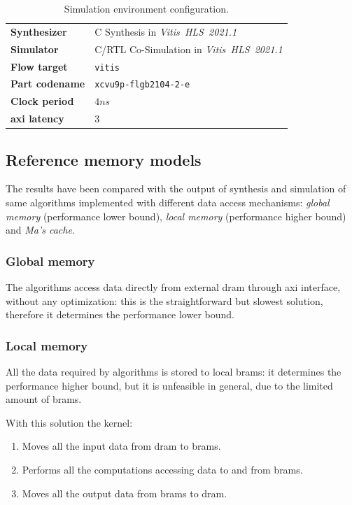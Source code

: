 \documentclass[11pt,a4paper,oneside]{memoir}
\begin{document}
\begin{table}[!htb]
	\begin{center}
		\begin{tabular}{ll}
			\hline
			\rowcolor{gray!25}
			\textbf{Synthesizer} & C Synthesis in
			\emph{Vitis\texttrademark~HLS~2021.1} \\
			\textbf{Simulator} & C/RTL Co-Simulation in
			\emph{Vitis\texttrademark~HLS~2021.1} \\
			\rowcolor{gray!25}
			\textbf{Flow target} & \texttt{vitis} \\
			\textbf{Part codename} & \texttt{xcvu9p-flgb2104-2-e} \\
			\rowcolor{gray!25}
			\textbf{Clock period} & $4 ns$ \\
			\textbf{\ac{axi} latency} & 3 \\
			\hline
		\end{tabular}
	\end{center}
	\caption{Simulation environment configuration.}
	\label{tab:sim_config}
\end{table}

\subsection{Reference memory models}
The results have been compared with the output of synthesis and simulation of
same algorithms implemented with different data access mechanisms: \emph{global
memory} (performance lower bound), \emph{local memory} (performance higher
bound) and \emph{Ma's cache}.

\subsubsection{Global memory}
The algorithms access data directly from external \ac{dram} through \ac{axi}
interface, without any optimization: this is the straightforward but slowest
solution, therefore it determines the performance lower bound.

\subsubsection{Local memory}
All the data required by algorithms is stored to local \acp{bram}: it determines
the performance higher bound, but it is unfeasible in general, due to the
limited amount of \acp{bram}.

With this solution the kernel:
\begin{enumerate}
	\item Moves all the input data from \ac{dram} to \acp{bram}.
	\item Performs all the computations accessing data to and from
		\acp{bram}. 
	\item Moves all the output data from \acp{bram} to \ac{dram}.
\end{enumerate}
\end{document}
